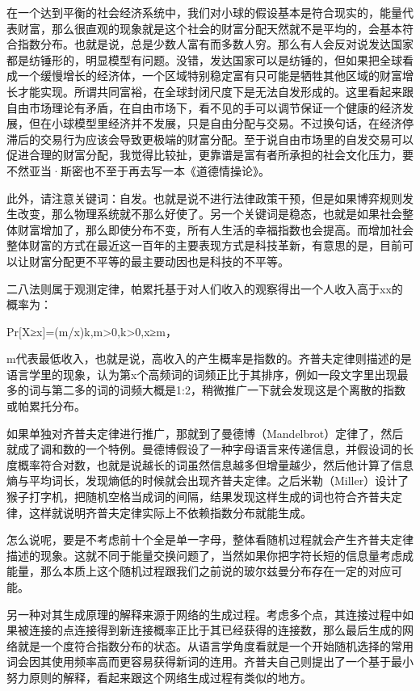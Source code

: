\documentclass[]{book}
\begin{document}
在一个达到平衡的社会经济系统中，我们对小球的假设基本是符合现实的，能量代表财富，那么很直观的现象就是这个社会的财富分配天然就不是平均的，会基本符合指数分布。也就是说，总是少数人富有而多数人穷。那么有人会反对说发达国家都是纺锤形的，明显模型有问题。没错，发达国家可以是纺锤的，但如果把全球看成一个缓慢增长的经济体，一个区域特别稳定富有只可能是牺牲其他区域的财富增长才能实现。所谓共同富裕，在全球封闭尺度下是无法自发形成的。这里看起来跟自由市场理论有矛盾，在自由市场下，看不见的手可以调节保证一个健康的经济发展，但在小球模型里经济并不发展，只是自由分配与交易。不过换句话，在经济停滞后的交易行为应该会导致更极端的财富分配。至于说自由市场里的自发交易可以促进合理的财富分配，我觉得比较扯，更靠谱是富有者所承担的社会文化压力，要不然亚当·斯密也不至于再去写一本《道德情操论》。

此外，请注意关键词：自发。也就是说不进行法律政策干预，但是如果博弈规则发生改变，那么物理系统就不那么好使了。另一个关键词是稳态，也就是如果社会整体财富增加了，那么即使分布不变，所有人生活的幸福指数也会提高。而增加社会整体财富的方式在最近这一百年的主要表现方式是科技革新，有意思的是，目前可以让财富分配更不平等的最主要动因也是科技的不平等。

二八法则属于观测定律，帕累托基于对人们收入的观察得出一个人收入高于xx的概率为：

Pr{[}X≥x{]}=(m/x)k,m\textgreater{}0,k\textgreater{}0,x≥m，

m代表最低收入，也就是说，高收入的产生概率是指数的。齐普夫定律则描述的是语言学里的现象，认为第x个高频词的词频正比于其排序，例如一段文字里出现最多的词与第二多的词的词频大概是1:2，稍微推广一下就会发现这是个离散的指数或帕累托分布。

如果单独对齐普夫定律进行推广，那就到了曼德博（Mandelbrot）定律了，然后就成了调和数的一个特例。曼德博假设了一种字母语言来传递信息，并假设词的长度概率符合对数，也就是说越长的词虽然信息越多但增量越少，然后他计算了信息熵与平均词长，发现熵低的时候就会出现齐普夫定律。之后米勒（Miller）设计了猴子打字机，把随机空格当成词的间隔，结果发现这样生成的词也符合齐普夫定律，这样就说明齐普夫定律实际上不依赖指数分布就能生成。

怎么说呢，要是不考虑前十个全是单一字母，整体看随机过程就会产生齐普夫定律描述的现象。这就不同于能量交换问题了，当然如果你把字符长短的信息量考虑成能量，那么本质上这个随机过程跟我们之前说的玻尔兹曼分布存在一定的对应可能。

另一种对其生成原理的解释来源于网络的生成过程。考虑多个点，其连接过程中如果被连接的点连接得到新连接概率正比于其已经获得的连接数，那么最后生成的网络就是一个度符合指数分布的状态。从语言学角度看就是一个开始随机选择的常用词会因其使用频率高而更容易获得新词的连用。齐普夫自己则提出了一个基于最小努力原则的解释，看起来跟这个网络生成过程有类似的地方。
\end{document}
